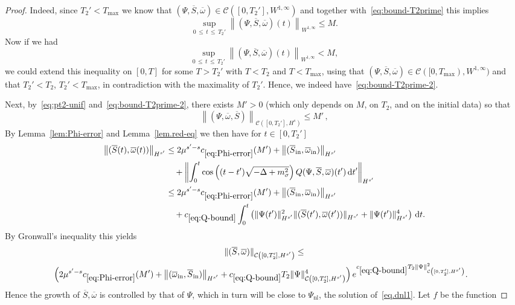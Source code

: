 \documentclass[10pt]{amsart}
\theoremstyle{definition}\newtheorem{defi}[theo]{Definition}\newtheorem{rema}[theo]{Remark}\newtheorem{exam}[theo]{Example}\newtheorem{exem}[theo]{Example}\newtheorem{nota}[theo]{Notation}
\newcommand{\rmin}{\mathrm{in}}
\newcommand{\nl}{\mathrm{nl}}
\newcommand{\cC}{\mathcal{C}}
\renewcommand\d[1]{{\ensuremath{\,\text{d}#1}}}
\begin{document}
\begin{proof}
Indeed, since $T_2'<T_{\max}$ we know that $(\Psi,\overline{S}, \overline{\omega})\in\cC([0,T_2'],W^{1,\infty})$ and together with~\eqref{eq:bound-T2prime} this implies
\[
\sup_{0\,\leq\,t\,\leq\,T_2'}\left\|(\Psi,\overline{S}, \overline{\omega})(t)\right\|_{W^{1,\infty}}\leq M.
\]
Now if we had
\[
\sup_{0\,\leq\,t\,\leq\,T_2'}\left\|(\Psi,\overline{S}, \overline{\omega})(t)\right\|_{W^{1,\infty}}<M,
\]
we could extend this inequality on $[0,T]$ for some $T>T_2'$ with $T<T_2$ and $T<T_{\max}$, using that $(\Psi,\overline{S}, \overline{\omega})\in\cC([0,T_{\max}),W^{1,\infty})$ and that $T_2'<T_2$, $T_2'<T_{\max}$, in contradiction with the maximality of $T_2'$. Hence, we indeed have~\eqref{eq:bound-T2prime-2}.

Next, by~\eqref{eq:pt2-unif} and~\eqref{eq:bound-T2prime-2}, there exists $M'>0$ (which only depends on $M$, on $T_2$, and on the initial data) so that
\[
\left\|(\Psi,\overline{\omega},\overline{S})\right\|_{\cC\left([0,T_2'], {H}^s\right)}
\leq M'\,,
\]
By Lemma~\ref{lem:Phi-error} and Lemma~\ref{lem.red-eq} we then have for $t\in [0, T_2']$
\begin{align*}
\left\|(\overline{S}(t), \overline{\omega}(t))\right\|_{H^{s'}} &\leq 2\mu^{s'-s} c_{\eqref{eq:Phi-error}}(M') + \left\|(\overline{S}_\rmin,\overline{\omega}_\rmin)\right\|_{H^{s'}} \\
&\quad + \left\|\int_0^t\cos\left((t-t')\sqrt{-\Delta + m^2_\sigma}\right) Q(\Psi, \overline{S}, \overline{\omega})(t')\d t'\right\|_{H^{s'}} \\
&\leq 2\mu^{s'-s} c_{\eqref{eq:Phi-error}}(M') + \left\|(\overline{S}_\rmin,\overline{\omega}_\rmin)\right\|_{H^{s'}} \\
&\quad + c_{\eqref{eq:Q-bound}}\int_0^{t} \left(\|\Psi(t')\|_{H^{s'}}^2 \|(\overline{S}(t'), \overline{\omega}(t'))\|_{H^{s'}} + \|\Psi(t')\|_{H^{s'}}^4\right)\d t.
\end{align*}
By Gronwall's inequality this yields
\begin{multline}\label{eq:S-Psi bound}
\|(\overline{S}, \overline{\omega})\|_{\cC\left([0,T_2'], H^{s'}\right)}\leq\\
\mkern-14mu\left(2\mu^{s'-s}c_{\eqref{eq:Phi-error}}(M') + \left\|(\overline\omega_\rmin, \overline{S}_\rmin)\right\|_{H^{s'}} +c_{\eqref{eq:Q-bound}} T_2 \|\Psi\|_{\cC\left([0,T_2'], H^{s'}\right)}^4 \right) e^{c_{\eqref{eq:Q-bound}} T_2 \|\Psi\|_{\cC\left([0,T_2'], H^{s'}\right)}^2}.
\end{multline}
Hence the growth of $\overline{S}, \overline{\omega}$ is controlled by that of $\Psi$, which in turn will be close to $\Psi_\nl$, the solution of~\eqref{eq.dnl1}. Let $f$ be the function

\end{proof}
\end{document}
